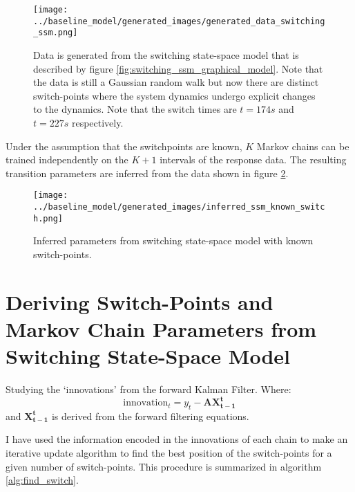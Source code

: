 \documentclass{article}
\begin{document}
\begin{figure}
\center
\texttt{[image: ../baseline\_model/generated\_images/generated\_data\_switching\_ssm.png]}
\caption{Data is generated from the switching state-space model that is described by figure \ref{fig:switching_ssm_graphical_model}. Note that the data is still a Gaussian random walk but now there are distinct switch-points where the system dynamics undergo explicit changes to the dynamics. Note that the switch times are $t=174s$ and $t=227s$ respectively.}\label{fig:generated_data_switching_ssm}
\end{figure}

Under the assumption that the switchpoints are known, $K$ Markov chains can be trained independently on the $K+1$ intervals of the response data. The resulting transition parameters are inferred from the data shown in figure \ref{fig:inferred_ssm_known_switch}.

\begin{figure}
\center
\texttt{[image: ../baseline\_model/generated\_images/inferred\_ssm\_known\_switch.png]}
\caption{Inferred parameters from switching state-space model with known switch-points.}\label{fig:inferred_ssm_known_switch}
\end{figure}

\section{Deriving Switch-Points and Markov Chain Parameters from Switching State-Space Model}

Studying the `innovations' from the forward Kalman Filter. Where:
\begin{equation}\label{innovations}
\text{innovation}_t = y_t - \mathbf{A} \mathbf{X^t_{t-1}}
\end{equation}
and $\mathbf{X^t_{t-1}}$ is derived from the forward filtering equations.

I have used the information encoded in the innovations of each chain to make an iterative update algorithm to find the best position of the switch-points for a given number of switch-points. This procedure is summarized in algorithm \ref{alg:find_switch}.
\end{document}
